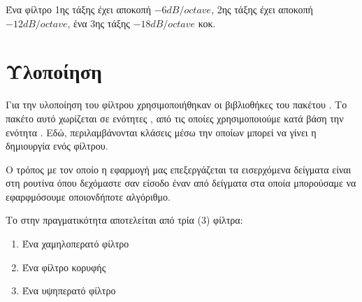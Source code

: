 \documentclass{article}
\begin{document}
Ένα φίλτρο  1ης τάξης έχει αποκοπή $-6dB/octave$, 2ης τάξης έχει αποκοπή $-12dB/octave$, ένα 3ης τάξης $-18dB/octave$ κοκ.

\section{Υλοποίηση}

Για την υλοποίηση του φίλτρου χρησιμοποιήθηκαν οι βιβλιοθήκες του πακέτου 
. Το πακέτο αυτό χωρίζεται σε ενότητες , από τις οποίες
χρησιμοποιούμε κατά βάση την ενότητα . 
Εδώ, περιλαμβάνονται κλάσεις μέσω την οποίων μπορεί να γίνει η δημιουργία 
ενός φίλτρου.

Ο τρόπος με τον οποίο η εφαρμογή μας επεξεργάζεται τα εισερχόμενα δείγματα
 είναι στη ρουτίνα  όπου δεχόμαστε σαν είσοδο έναν
 από δείγματα στα οποία μπορούσαμε να εφαρφμόσουμε οποιονδήποτε αλγόριθμο. 

Το  στην πραγματικότητα αποτελείται από τρία (3) φίλτρα: 

\begin{enumerate}
    \item Ένα χαμηλοπερατό φίλτρο 
    \item Ένα φίλτρο κορυφής
    \item Ένα υψηπερατό φίλτρο
\end{enumerate}
\end{document}
